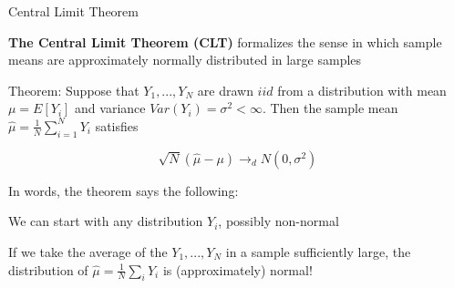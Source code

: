 \documentclass[11pt,english,handout]{beamer}
\newenvironment{wideitemize}{\itemize\addtolength{\itemsep}{10pt}}{\enditemize}
\begin{document}
\begin{frame}{Central Limit Theorem}
\begin{wideitemize}

\item
\textbf{The Central Limit Theorem (CLT)} formalizes the sense in which sample means are approximately normally distributed in large samples

\pause
\item
Theorem: Suppose that $Y_1,...,Y_N$ are drawn $iid$ from a distribution with mean $\mu = E[Y_i]$ and variance $Var(Y_i) = \sigma^2 < \infty$. Then the sample mean $\hat\mu = \frac{1}{N} \sum_{i=1}^N Y_i$ satisfies

$$ \sqrt{N} (\hat\mu - \mu) \rightarrow_d N(0, \sigma^2) $$


\pause
\item
In words, the theorem says the following: 


\begin{enumerate}
\normalsize{
\item 
We can start with any distribution $Y_i$, possibly non-normal 

\item
If we take the average of the $Y_1,...,Y_N$ in a sample sufficiently large, the distribution of $\hat\mu = \frac{1}{N} \sum_i Y_i$ is (approximately) normal! 
}
\end{enumerate}

\end{wideitemize}	

\end{frame}
\end{document}
